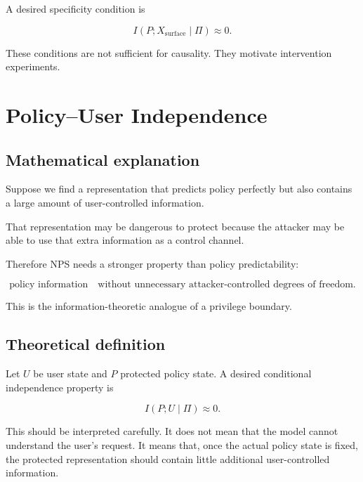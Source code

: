 \documentclass[11pt]{article}
\begin{document}
A desired specificity condition is

\begin{equation}
\boxed{
I(P;X_{\mathrm{surface}}\mid\Pi)\approx0.
}
\end{equation}

These conditions are not sufficient for causality. They motivate
intervention experiments.

\section{Policy--User Independence}

\subsection*{Mathematical explanation}

Suppose we find a representation that predicts policy perfectly but also
contains a large amount of user-controlled information.

That representation may be dangerous to protect because the attacker may be
able to use that extra information as a control channel.

Therefore NPS needs a stronger property than policy predictability:

\begin{equation}
\text{policy information}
\quad\text{without unnecessary attacker-controlled degrees of freedom}.
\end{equation}

This is the information-theoretic analogue of a privilege boundary.

\subsection*{Theoretical definition}

Let $U$ be user state and $P$ protected policy state. A desired conditional
independence property is

\begin{equation}
\boxed{
I(P;U\mid\Pi)\approx0.
}
\end{equation}

This should be interpreted carefully. It does not mean that the model cannot
understand the user's request. It means that, once the actual policy state is
fixed, the protected representation should contain little additional
user-controlled information.
\end{document}
